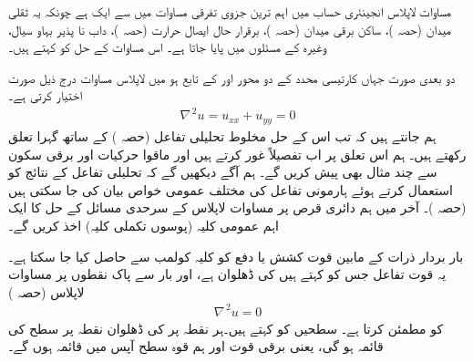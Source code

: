 مساوات لاپلاس  انجینئری حساب میں اہم ترین جزوی تفرقی مساوات میں سے ایک ہے چونکہ  یہ ثقلی میدان (حصہ )، ساکن برقی میدان  (حصہ )، برقرار حال ایصال حرارت (حصہ )، داب نا پذیر بہاو سیال، وغیرہ کے مسئلوں میں پایا جاتا ہے۔ اس مساوات کے حل کو  کہتے ہیں۔

دو بعدی صورت جہاں  کارتیسی محدد کے دو محور  اور  کے تابع ہو میں لاپلاس مساوات درج ذیل صورت اختیار کرتی ہے۔
\begin{align*}
\nabla^{\,2}u=u_{xx}+u_{yy}=0
\end{align*}
ہم جانتے ہیں کہ تب اس کے حل مخلوط تحلیلی تفاعل (حصہ ) کے ساتھ گہرا تعلق رکھتے ہیں۔ ہم اس تعلق پر اب تفصیلاً غور کرتے ہیں اور ماقوا حرکیات اور برقی سکون سے چند مثال بھی پیش کریں گے۔ ہم آگے دیکھیں گے کہ تحلیلی تفاعل کے نتائج کو استعمال کرتے ہوئے ہارمونی تفاعل کی مختلف عمومی خواص  بیان کی جا سکتی ہیں (حصہ )۔ آخر میں ہم دائری قرص پر مساوات لاپلاس کے سرحدی مسائل کے حل کا ایک اہم عمومی کلیہ (پوسوں تکملی کلیہ) اخذ کریں گے۔

بار بردار ذرات کے مابین قوت کشش یا دفع کو کلیہ کولمب سے حاصل  کیا جا سکتا ہے۔یہ قوت تفاعل  جس کو  کہتے ہیں کی ڈھلوان ہے، اور بار سے پاک نقطوں پر  مساوات لاپلاس (حصہ )
\begin{align*}
\nabla^{\,2}u=0
\end{align*}
کو مطمئن کرتا ہے۔ سطحیں  کو  کہتے ہیں۔ہر نقطہ  پر  کی ڈھلوان نقطہ  پر سطح  کی قائمہ ہو گی، یعنی برقی قوت اور ہم قوہ سطح آپس میں قائمہ ہوں گے۔


